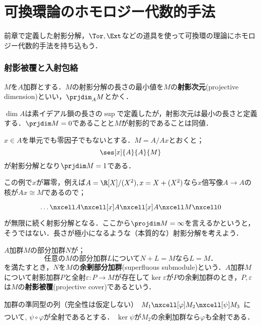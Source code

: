 \part[Homological method to ring theory]{可換環論のホモロジー代数的手法}
前章で定義した射影分解，$\Tor,\Ext$などの道具を使って可換環の理論にホモロジー代数的手法を持ち込もう．

\section{射影被覆と入射包絡}
\begin{defi}[射影次元]
	$M$を$A$加群とする．$M$の射影分解の長さの最小値を$M$の\textbf{射影次元}(projective dimension)といい，$\prjdim_A M$とかく．
\end{defi}

$\dim A$は素イデアル鎖の長さの$\sup$で定義したが，射影次元は最小の長さと定義する．$\prjdim M=0$であることと$M$が射影的であることは同値．

\begin{ex}
	$x\in A$を単元でも零因子でもないとする．$M=A/Ax$とおくと；
	\[\ses[x]{A}{A}{M}\]
	が射影分解となり$\prjdim M=1$である．
\end{ex}

この例で$x$が冪零，例えば$A=\R[X]/(X^2),x=X+(X^2)$なら$x$倍写像$A\to A$の核が$Ax\cong M$であるので；
\[\begin{tikzcd}
	\dots\nxcell A\nxcell[x]A\nxcell[x] A\nxcell M\nxcell0
\end{tikzcd}\]
が無限に続く射影分解となる．ここから$\projdim M=\infty$を言えるかというと，そうではない．長さが極小になるような（本質的な）射影分解を考えよう．

\begin{defi}[射影被覆]
	$A$加群$M$の部分加群$N$が；
	\[\text{任意の$M$の部分加群$L$について$N+L=M$なら$L=M$．}\]
	を満たすとき，$N$を$M$の\textbf{余剰部分加群}(superfluous submodule)という．$A$加群$M$について射影加群$P$と全射$\varepsilon:P\to M$が存在して$\ker\varepsilon$が$P$の余剰加群のとき，$P,\varepsilon$は$M$の\textbf{射影被覆}(projective cover)であるという．
\end{defi}

\begin{lem}\label{lem:余剰加群の補題}
	加群の準同型の列（完全性は仮定しない）$\begin{tikzcd}
	M_1\nxcell[\varphi]M_2\nxcell[\psi]M_3
	\end{tikzcd}$について, $\psi\circ\varphi$が全射であるとする． $\ker\psi $が$M_2$の余剰加群なら$\varphi$も全射である．
\end{lem}

